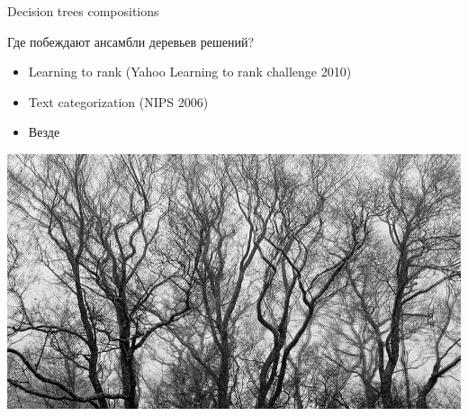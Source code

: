 \documentclass[10pt]{beamer}
\begin{document}
\begin{frame}{Decision trees compositions}
\begin{center}
\begin{block}{Где побеждают ансамбли деревьев решений?}
\begin{itemize}
    \item Learning to rank (Yahoo Learning to rank challenge 2010)
    \item Text categorization (NIPS 2006)
    \item Везде
\end{itemize}
\end{block}
    \includegraphics[scale=1.0]{images/forest.jpg}
\end{center}
\end{frame}
\end{document}
